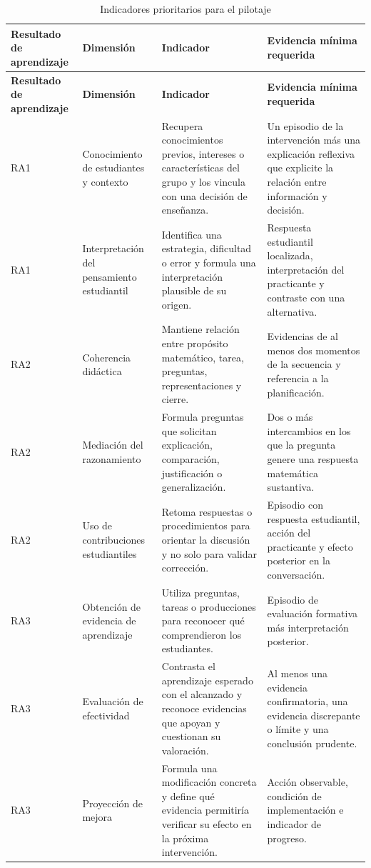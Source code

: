 \documentclass[11pt,a4paper]{article}
\begin{document}
\begin{longtable}{p{2.4cm}p{4.2cm}p{4.4cm}p{4.6cm}}
\caption{Indicadores prioritarios para el pilotaje}\\
\toprule
\textbf{Resultado de aprendizaje} &
\textbf{Dimensión} &
\textbf{Indicador} &
\textbf{Evidencia mínima requerida}\\
\midrule
\endfirsthead
\toprule
\textbf{Resultado de aprendizaje} &
\textbf{Dimensión} &
\textbf{Indicador} &
\textbf{Evidencia mínima requerida}\\
\midrule
\endhead

RA1 &
Conocimiento de estudiantes y contexto &
Recupera conocimientos previos, intereses o características del grupo y los vincula con una decisión de enseñanza. &
Un episodio de la intervención más una explicación reflexiva que explicite la relación entre información y decisión.\\
\midrule

RA1 &
Interpretación del pensamiento estudiantil &
Identifica una estrategia, dificultad o error y formula una interpretación plausible de su origen. &
Respuesta estudiantil localizada, interpretación del practicante y contraste con una alternativa.\\
\midrule

RA2 &
Coherencia didáctica &
Mantiene relación entre propósito matemático, tarea, preguntas, representaciones y cierre. &
Evidencias de al menos dos momentos de la secuencia y referencia a la planificación.\\
\midrule

RA2 &
Mediación del razonamiento &
Formula preguntas que solicitan explicación, comparación, justificación o generalización. &
Dos o más intercambios en los que la pregunta genere una respuesta matemática sustantiva.\\
\midrule

RA2 &
Uso de contribuciones estudiantiles &
Retoma respuestas o procedimientos para orientar la discusión y no solo para validar corrección. &
Episodio con respuesta estudiantil, acción del practicante y efecto posterior en la conversación.\\
\midrule

RA3 &
Obtención de evidencia de aprendizaje &
Utiliza preguntas, tareas o producciones para reconocer qué comprendieron los estudiantes. &
Episodio de evaluación formativa más interpretación posterior.\\
\midrule

RA3 &
Evaluación de efectividad &
Contrasta el aprendizaje esperado con el alcanzado y reconoce evidencias que apoyan y cuestionan su valoración. &
Al menos una evidencia confirmatoria, una evidencia discrepante o límite y una conclusión prudente.\\
\midrule

RA3 &
Proyección de mejora &
Formula una modificación concreta y define qué evidencia permitiría verificar su efecto en la próxima intervención. &
Acción observable, condición de implementación e indicador de progreso.\\
\bottomrule
\end{longtable}
\end{document}
